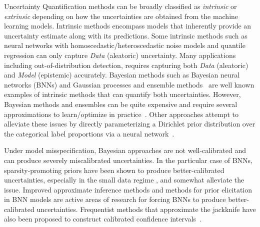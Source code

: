 Uncertainty Quantification methods can be broadly classified as \textit{intrinsic} or \textit{extrinsic} depending on how the uncertainties are obtained from the machine learning models. Intrinsic methods encompass models that inherently provide an uncertainty estimate along with its predictions. Some intrinsic methods such as neural networks with homoscedastic/heteroscedastic noise models \citep{wakefield2013bayesian} and quantile regression \cite{koenker1978regression} can only capture \textit{Data} (aleatoric) uncertainty. Many applications including out-of-distribution detection, requires capturing both \textit{Data} (aleatoric) and \textit{Model} (epistemic) accurately. Bayesian methods such as Bayesian neural networks (BNNs) \cite{neal2012bayesian,blundell15,welling2011bayesian} and Gaussian processes \cite{gpbook} and ensemble methods~\citep{lakshminarayanan2017simple} are well known examples of intrinsic methods that can 
quantify both uncertainties. However, Bayesian methods and ensembles can be quite expensive and require several approximations to learn/optimize in practice~\citep{mackay1992practical,kristiadi2021learnable,welling2011bayesian}. Other approaches attempt to alleviate these issues by directly parameterizing a Dirichlet prior distribution over the categorical label proportions via a neural network~\citep{malinin2018predictive, sensoy2018evidential, malinin2019reverse, nandy2020towards, charpentier2020posterior, joo2020being}. 

Under model misspecification, Bayesian approaches are not well-calibrated and can produce severely miscalibrated uncertainties. In the particular case of BNNs, sparsity-promoting priors have been shown to produce better-calibrated uncertainties, especially in the small data regime \cite{ghosh2019model}, and somewhat alleviate the issue. Improved approximate inference methods and methods for prior elicitation in BNN models are active areas of research for forcing BNNs to produce better-calibrated uncertainties. Frequentist methods that approximate the jackknife have also been proposed to construct calibrated confidence intervals~\cite{alaa2019discriminative}.



